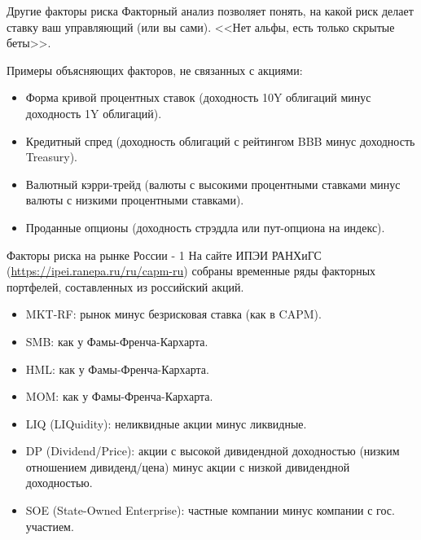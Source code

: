 \documentclass{beamer}
\begin{document}
\begin{frame}{Другие факторы риска}
\justify
Факторный анализ позволяет понять, на какой риск делает ставку ваш управляющий (или вы сами). <<Нет альфы, есть только скрытые беты>>.

\vspace{\baselineskip}
Примеры объясняющих факторов, не связанных с акциями:
\begin{itemize}
\justifying
\item Форма кривой процентных ставок (доходность 10Y облигаций минус доходность 1Y облигаций).
\item Кредитный спред (доходность облигаций с рейтингом BBB минус доходность Treasury).
\item Валютный кэрри-трейд (валюты с высокими процентными ставками минус валюты с низкими процентными ставками).
\item Проданные опционы (доходность стрэддла или пут-опциона на индекс).
\end{itemize}
\end{frame}



\begin{frame}{Факторы риска на рынке России - 1}
\justify
На сайте ИПЭИ РАНХиГС ({\small \url{https://ipei.ranepa.ru/ru/capm-ru}}) собраны временные ряды факторных портфелей, составленных из российский акций.
\begin{itemize}
\justifying
\item MKT-RF: рынок минус безрисковая ставка (как в CAPM).
\item SMB: как у Фамы-Френча-Кархарта.
\item HML: как у Фамы-Френча-Кархарта.
\item MOM: как у Фамы-Френча-Кархарта.
\item LIQ (LIQuidity): неликвидные акции минус ликвидные.
\item DP (Dividend/Price): акции с высокой дивидендной доходностью (низким отношением дивиденд/цена) минус акции с низкой дивидендной доходностью.
\item SOE (State-Owned Enterprise): частные компании минус компании с гос. участием.
\end{itemize}
\end{frame}
\end{document}
